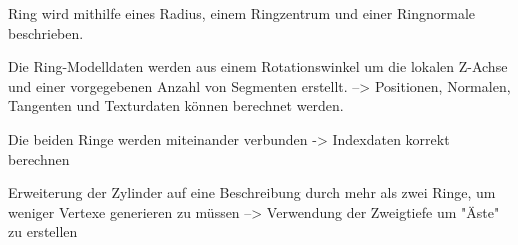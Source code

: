 Ring wird mithilfe eines Radius, einem Ringzentrum und einer Ringnormale beschrieben.

Die Ring-Modelldaten werden aus einem Rotationswinkel um die lokalen Z-Achse und einer vorgegebenen Anzahl von Segmenten erstellt. --> Positionen, Normalen, Tangenten und Texturdaten können berechnet werden.

Die beiden Ringe werden miteinander verbunden -> Indexdaten korrekt berechnen

Erweiterung der Zylinder auf eine Beschreibung durch mehr als zwei Ringe, um weniger Vertexe generieren zu müssen --> Verwendung der Zweigtiefe um "Äste" zu erstellen


